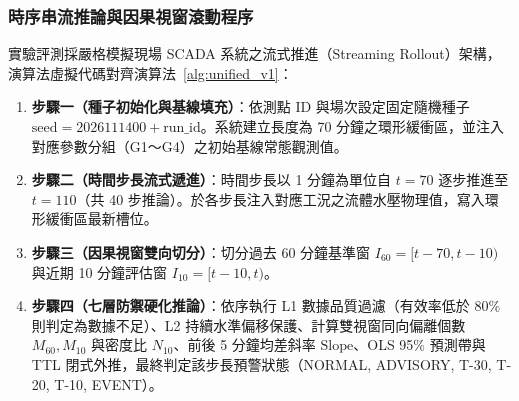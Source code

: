 \documentclass[fontset=none, a4paper, 12pt]{ctexart}
\begin{document}
\begin{doublespace}
\subsubsection{時序串流推論與因果視窗滾動程序}
實驗評測採嚴格模擬現場 SCADA 系統之流式推進（Streaming Rollout）架構，演算法虛擬代碼對齊演算法~\ref{alg:unified_v1}：
\begin{enumerate}
    \item \textbf{步驟一（種子初始化與基線填充）}：依測點 ID 與場次設定固定隨機種子 $\text{seed} = 2026111400 + \text{run\_id}$。系統建立長度為 70 分鐘之環形緩衝區，並注入對應參數分組（G1～G4）之初始基線常態觀測值。
    \item \textbf{步驟二（時間步長流式遞進）}：時間步長以 1 分鐘為單位自 $t = 70$ 逐步推進至 $t = 110$（共 40 步推論）。於各步長注入對應工況之流體水壓物理值，寫入環形緩衝區最新槽位。
    \item \textbf{步驟三（因果視窗雙向切分）}：切分過去 60 分鐘基準窗 $I_{60} = [t-70, t-10)$ 與近期 10 分鐘評估窗 $I_{10} = [t-10, t)$。
    \item \textbf{步驟四（七層防禦硬化推論）}：依序執行 L1 數據品質過濾（有效率低於 80\% 則判定為數據不足）、L2 持續水準偏移保護、計算雙視窗同向偏離個數 $M_{60}, M_{10}$ 與密度比 $N_{10}$、前後 5 分鐘均差斜率 $\mathrm{Slope}$、OLS 95\% 預測帶與 TTL 閉式外推，最終判定該步長預警狀態（NORMAL, ADVISORY, T-30, T-20, T-10, EVENT）。
\end{enumerate}


\end{doublespace}
\end{document}
